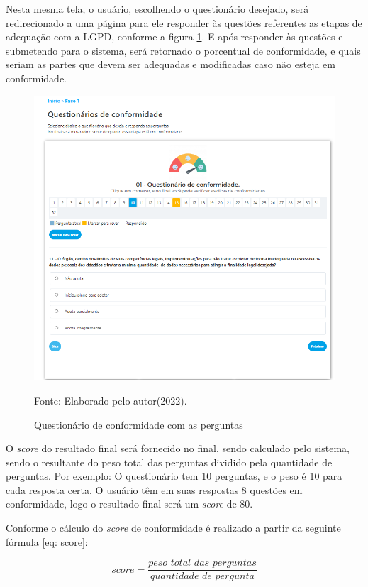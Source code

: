 \documentclass[
	12pt,				%
	openright,			%
	oneside,			%
	a4paper,			%
	english,			%
	french,				%
	spanish,			%
	brazil,				%
	]{abntex2}
\begin{document}
Nesta mesma tela, o usuário, escolhendo o questionário desejado, será redirecionado a uma página para ele responder às questões referentes as etapas de adequação com a LGPD, conforme a figura \ref{fig: fase11}. E após responder às questões e submetendo para o sistema, será retornado o porcentual de conformidade, e quais seriam as partes que devem ser adequadas e modificadas caso não esteja em conformidade.


\begin{figure}[ht]
    \centering
    \caption{Questionário de conformidade com as perguntas}
    \includegraphics[width=6.2in]{Images/fase11.png}
    \label{fig: fase11}
    
    \centering \small Fonte: Elaborado pelo autor(2022).
\end{figure}

O \textit{score} do resultado final será fornecido no final, sendo calculado pelo sistema, sendo o resultante do peso total das perguntas dividido pela quantidade de perguntas. Por exemplo: O questionário tem 10 perguntas, e o peso é 10 para cada resposta certa. O usuário têm em suas respostas 8 questões em conformidade, logo o resultado final será um \textit{score} de 80.

Conforme o cálculo do \textit{score} de conformidade é realizado a partir da seguinte fórmula \ref{eq: score}: 

\begin{equation}
\label{eq: score}
    score = \frac {\textit{peso total das perguntas}} {\textit{quantidade de pergunta}}
\end{equation}
\end{document}
